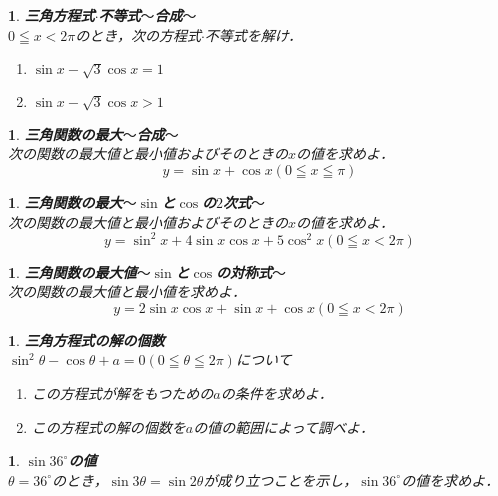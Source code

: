 \documentclass[10pt,
fleqn,
dvipdfmx,
uplatex
]{jsarticle}
\newtheorem{question}[Question]{}
\begin{document}
\begin{question}{\bf\boldmath 三角方程式$\cdot$不等式$〜$合成$〜$}\\
$0\leqq x<2\pi$のとき，次の方程式$\cdot$不等式を解け．
\begin{enumerate}
\item $\sin x-\sqrt 3\cos x=1$
\item $\sin x-\sqrt 3\cos x>1$
\end{enumerate}

\end{question}



\begin{question}{\bf\boldmath 三角関数の最大$〜$合成$〜$}\\
次の関数の最大値と最小値およびそのときの$x$の値を求めよ．
\[y=\sin x+\cos x\left(0\leqq x\leqq \pi \right)\]
\end{question}



\begin{question}{\bf\boldmath 三角関数の最大$〜\sin$と$\cos$の$2$次式$〜$}\\
次の関数の最大値と最小値およびそのときの$x$の値を求めよ．
\[y=\sin ^2{x}+4\sin {x}\cos {x}+5\cos ^2{x}\left(0\leqq x<2\pi \right)\]
\end{question}



\begin{question}{\bf\boldmath 三角関数の最大値$〜\sin$と$\cos$の対称式$〜$}\\
次の関数の最大値と最小値を求めよ．
\[y=2\sin {x}\cos {x}+\sin {x}+\cos {x}\left(0\leqq x<2\pi \right)\]
\end{question}



\begin{question}{\bf\boldmath 三角方程式の解の個数}\\
$\sin ^2\theta -\cos \theta +a=0\left(0\leqq \theta \leqq 2\pi \right)$について
\begin{enumerate}
\item この方程式が解をもつための$a$の条件を求めよ．
\item この方程式の解の個数を$a$の値の範囲によって調べよ．
\end{enumerate}

\end{question}



\begin{question}{\bf\boldmath $\sin 36^\circ$の値}\\
$\theta ={36}^\circ$のとき，$\sin 3\theta =\sin 2\theta$が成り立つことを示し，$\sin {36}^\circ$の値を求めよ．
\end{question}
\end{document}

